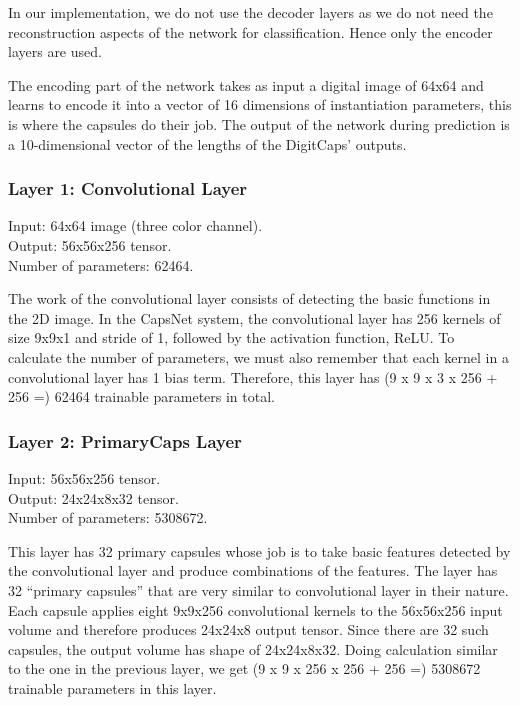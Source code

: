 \documentclass{vldb}
\begin{document}
In our implementation, we do not use the decoder layers as we do not need the reconstruction aspects of the network for classification. Hence only the encoder layers are used.
\par\bigskip
The encoding part of the network takes as input a digital image of 64x64 and learns to encode it into a vector of 16 dimensions of instantiation parameters, this is where the capsules do their job. The output of the network during prediction is a 10-dimensional vector of the lengths of the DigitCaps' outputs.


\subsubsection{Layer 1: Convolutional Layer} %
\label{sub:layer_1_convolutional_layer}
\noindent Input: 64x64 image (three color channel).
\\Output: 56x56x256 tensor.
\\Number of parameters: 62464.

\par\bigskip The work of the convolutional layer consists of detecting the basic functions in the 2D image. In the CapsNet system, the convolutional layer has 256 kernels of size 9x9x1 and stride of 1, followed by the activation function, ReLU. To calculate the number of parameters, we must also remember that each kernel in a convolutional layer has 1 bias term. Therefore, this layer has (9 x 9 x 3 x 256 + 256 =) 62464 trainable parameters in total.


\subsubsection{Layer 2: PrimaryCaps Layer} %
\label{sub:layer_2_primarycaps_layer}
\noindent Input: 56x56x256 tensor.
\\Output: 24x24x8x32 tensor.
\\Number of parameters: 5308672.

\par\bigskip This layer has 32 primary capsules whose job is to take basic features detected by the convolutional layer and produce combinations of the features. The layer has 32 “primary capsules” that are very similar to convolutional layer in their nature. Each capsule applies eight 9x9x256 convolutional kernels to the 56x56x256 input volume and therefore produces 24x24x8 output tensor. Since there are 32 such capsules, the output volume has shape of 24x24x8x32. Doing calculation similar to the one in the previous layer, we get (9 x 9 x 256 x 256 + 256 =) 5308672 trainable parameters in this layer.
\end{document}
